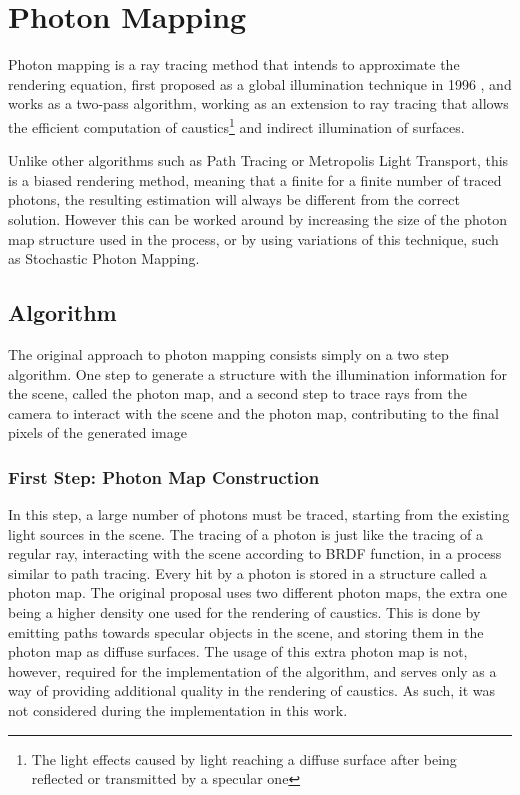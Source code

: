 \documentclass[main.tex]{subfiles}
\begin{document}
\section{Photon Mapping} \label{section:pm}

Photon mapping is a ray tracing method that intends to approximate the rendering equation, first proposed as a global illumination technique in 1996 \cite{jensen1996global}, and works as a two-pass algorithm, working as an extension to ray tracing that allows the efficient computation of caustics\footnote{The light effects caused by light reaching a diffuse surface after being reflected or transmitted by a specular one} and indirect illumination of surfaces.

Unlike other algorithms such as Path Tracing or Metropolis Light Transport, this is a biased rendering method, meaning that a finite for a finite number of traced photons, the resulting estimation will always be different from the correct solution. However this can be worked around by increasing the size of the photon map structure used in the process, or by using variations of this technique, such as Stochastic Photon Mapping.

\subsection{Algorithm}

The original approach to photon mapping consists simply on a two step algorithm. One step to generate a structure with the illumination information for the scene, called the photon map, and a second step to trace rays from the camera to interact with the scene and the photon map, contributing to the final pixels of the generated image


\subsubsection{First Step: Photon Map Construction}

In this step, a large number of photons must be traced, starting from the existing light sources in the scene. The tracing of a photon is just like the tracing of a regular ray, interacting with the scene according to \acs{BRDF} function, in a process similar to path tracing. Every hit by a photon is stored in a structure called a photon map.
The original proposal \cite{jensen1996global} uses two different photon maps, the extra one being a higher density one used for the rendering of caustics. This is done by emitting paths towards specular objects in the scene, and storing them in the photon map as diffuse surfaces.
The usage of this extra photon map is not, however, required for the implementation of the algorithm, and serves only as a way of providing additional quality in the rendering of caustics. As such, it was not considered during the implementation in this work.
\end{document}
